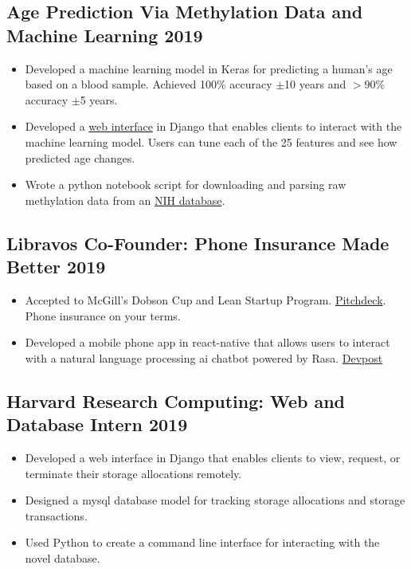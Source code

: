 \documentclass{article}
\begin{document}
\subsection{Age Prediction Via Methylation Data and Machine Learning \hfill 2019}
\begin{itemize}[leftmargin=0.5in]
  \setlength\itemsep{0.00em}
  \item Developed a machine learning model in Keras for predicting a human's age based on a blood sample. Achieved 100\% accuracy $\pm$10 years and $>90\%$ accuracy $\pm$5 years.
  \item Developed a \href{https://epigenosys.com}{web interface} in Django that enables clients to interact with the machine learning model. Users can tune each of the 25 features and see how predicted age changes.
  \item Wrote a python notebook script for downloading and parsing raw methylation data from an \href{https://www.ncbi.nlm.nih.gov/geo/query/acc.cgi?acc=GSE87571}{NIH database}.
\end{itemize}

\subsection{Libravos Co-Founder: Phone Insurance Made Better \hfill 2019}
\begin{itemize}[leftmargin=0.5in]
  \setlength\itemsep{0.00em}
\item Accepted to McGill's Dobson Cup and Lean Startup Program. \href{https://docs.google.com/presentation/d/1mExXYPrHCWZ_4uRn0mu0f3_F_bhrw97eSgIJtMoN90k/edit?usp=sharing}{Pitchdeck}. Phone insurance on your terms.
\item Developed a mobile phone app in react-native that allows users to interact with a natural language processing ai chatbot powered by Rasa. \href{https://devpost.com/software/libravos-mobile-app-with-chat-bot}{Devpost}
\end{itemize}

\subsection{Harvard Research Computing: Web and Database Intern \hfill 2019}
\begin{itemize}[leftmargin=0.5in]
  \setlength\itemsep{0.00em}
  \item Developed a web interface in Django that enables clients to view, request, or terminate their storage allocations remotely.
  \item Designed a mysql database model for tracking storage allocations and storage transactions.
  \item Used Python to create a command line interface for interacting with the novel database.
\end{itemize}
\end{document}
